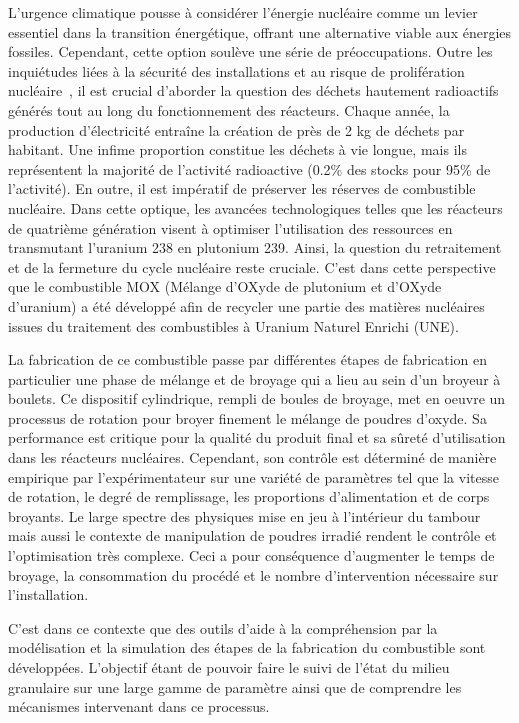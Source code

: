 L'urgence climatique pousse à considérer l'énergie nucléaire comme un levier essentiel dans la transition énergétique, offrant une alternative viable aux énergies fossiles. Cependant, cette option soulève une série de préoccupations. Outre les inquiétudes liées à la sécurité des installations et au risque de prolifération nucléaire~\cite{npt_resolution}, il est crucial d'aborder la question des déchets hautement radioactifs générés tout au long du fonctionnement des réacteurs. Chaque année, la production d'électricité entraîne la création de près de 2 kg de déchets par habitant. Une infime proportion constitue les déchets à vie longue, mais ils représentent la majorité de l'activité radioactive (0.2\% des stocks pour 95\% de l'activité). En outre, il est impératif de préserver les réserves de combustible nucléaire. Dans cette optique, les avancées technologiques telles que les réacteurs de quatrième génération visent à optimiser l'utilisation des ressources en transmutant l'uranium 238 en plutonium 239. Ainsi, la question du retraitement et de la fermeture du cycle nucléaire reste cruciale. C'est dans cette perspective que le combustible MOX (Mélange d’OXyde de plutonium et d’OXyde d’uranium) a été développé afin de recycler une partie des matières nucléaires issues du traitement des combustibles à Uranium Naturel Enrichi (UNE).

La fabrication de ce combustible passe par différentes étapes de fabrication en particulier une phase de mélange et de broyage qui a lieu au sein d'un broyeur à boulets. Ce dispositif cylindrique, rempli de boules de broyage, met en oeuvre un processus de rotation pour broyer finement le mélange de poudres d'oxyde. Sa performance est critique pour la qualité du produit final et sa sûreté d'utilisation dans les réacteurs nucléaires. Cependant, son contrôle est déterminé de manière empirique par l'expérimentateur sur une variété de paramètres tel que la vitesse de rotation, le degré de remplissage, les proportions d'alimentation et de corps broyants. Le large spectre des physiques mise en jeu à l'intérieur du tambour mais aussi le contexte de manipulation de poudres irradié rendent le contrôle et l'optimisation très complexe. Ceci a pour conséquence d’augmenter le temps de broyage, la consommation du procédé et le nombre d’intervention nécessaire sur l’installation.

C'est dans ce contexte que des outils d'aide à la compréhension par la modélisation et la simulation des étapes de la fabrication du combustible sont développées. L'objectif étant de pouvoir faire le suivi de l'état du milieu granulaire sur une large gamme de paramètre ainsi que de comprendre les mécanismes intervenant dans ce processus.

